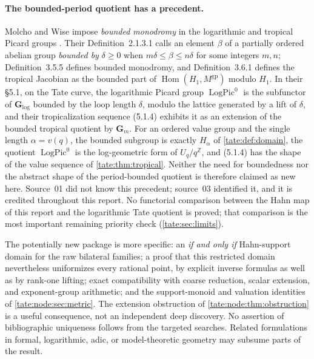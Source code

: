 \documentclass[11pt,letterpaper]{article}
\theoremstyle{definition}
\newcommand{\Z}{\mathbb Z}
\begin{document}
\paragraph{The bounded-period quotient has a precedent.}
Molcho and Wise impose \emph{bounded monodromy} in the logarithmic and
tropical Picard groups \cite{MW}. Their Definition~2.1.3.1 calls an element
$\beta$ of a partially ordered abelian group \emph{bounded by} $\delta\ge0$
when $m\delta\le\beta\le n\delta$ for some integers $m,n$; Definition~3.5.5
defines bounded monodromy, and Definition~3.6.1 defines the tropical
Jacobian as the bounded part of $\operatorname{Hom}(H_1,M^{\mathrm{gp}})$
modulo $H_1$. In their \S5.1, on the Tate curve, the logarithmic Picard
group $\operatorname{LogPic}^0$ is the subfunctor of $\mathbf G_{\log}$
bounded by the loop length $\delta$, modulo the lattice generated by a lift
of $\delta$, and their tropicalization sequence (5.1.4) exhibits it as an
extension of the bounded tropical quotient by $\mathbf G_m$. For an ordered
value group and the single length $\alpha=v(q)$, the bounded subgroup is
exactly $H_\alpha$ of \cref{tate:def:domain}, the quotient
$\operatorname{LogPic}^0$ is the log-geometric form of $U_q/q^\Z$, and
(5.1.4) has the shape of the value sequence of \cref{tate:thm:tropical}.
Neither the need for boundedness nor the abstract shape of the
period-bounded quotient is therefore claimed as new here. Source~01 did not
know this precedent; source~03 identified it, and it is credited throughout
this report. No functorial comparison between the Hahn map of this report
and the logarithmic Tate quotient is proved; that comparison is the most
important remaining priority check (\cref{tate:sec:limits}).

The potentially new package is more specific: an \emph{if and only if}
Hahn-support domain for the raw bilateral families; a proof that this
restricted domain nevertheless uniformizes every rational point, by
explicit inverse formulas as well as by rank-one lifting; exact
compatibility with coarse reduction, scalar extension, and exponent-group
arithmetic; and the support-monoid and valuation identities of
\cref{tate:node:sec:metric}. The extension obstruction of
\cref{tate:node:thm:obstruction} is a useful consequence, not an
independent deep discovery. No assertion of bibliographic uniqueness
follows from the targeted searches. Related formulations in formal,
logarithmic, adic, or model-theoretic geometry may subsume parts of the
result.
\end{document}
